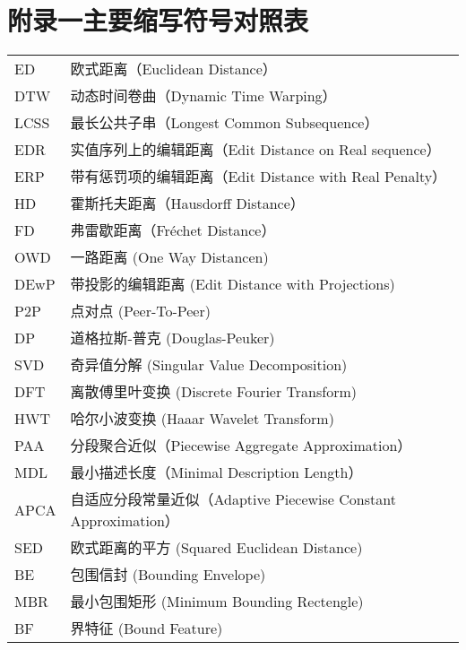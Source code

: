 \newpage
\chapter*{附录一\quad 主要缩写符号对照表}
\vskip 5mm

\begin{tabular}{p{}p{}}
	ED  &  欧式距离（Euclidean Distance）  \\
	DTW  & 动态时间卷曲（Dynamic Time Warping）  \\
	LCSS  & 最长公共子串（Longest Common Subsequence）  \\
	EDR  & 实值序列上的编辑距离（Edit Distance on Real sequence）  \\
	ERP  & 带有惩罚项的编辑距离（Edit Distance with  Real Penalty）  \\
	HD & 霍斯托夫距离（Hausdorff Distance）  \\
	FD  & 弗雷歇距离（Fréchet Distance）  \\
	OWD  & 一路距离 (One Way Distancen)  \\
	DEwP  & 带投影的编辑距离 (Edit Distance with   Projections)  \\
	P2P  & 点对点 (Peer-To-Peer) \\
	DP  & 道格拉斯-普克 (Douglas-Peuker)  \\
	SVD & 奇异值分解 (Singular Value Decomposition)  \\
	DFT  & 离散傅里叶变换 (Discrete Fourier Transform) \\
	HWT & 哈尔小波变换 (Haaar Wavelet Transform)  \\
	PAA & 分段聚合近似（Piecewise Aggregate Approximation）  \\
	MDL & 最小描述长度（Minimal Description Length）\\
	APCA & 自适应分段常量近似（Adaptive Piecewise Constant Approximation）\\
	SED & 欧式距离的平方 (Squared Euclidean Distance)\\
	BE & 包围信封 (Bounding Envelope)\\
	MBR & 最小包围矩形 (Minimum Bounding Rectengle)\\
	BF& 界特征 (Bound Feature)\\
\end{tabular}

\clearpage
\phantom{s}
\clearpage

